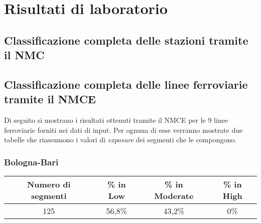 
\chapter{Risultati di laboratorio}
\label{risultati}
\section{Classificazione completa delle stazioni tramite il NMC}
\label{risultaticompleti}
\section{Classificazione completa delle linee ferroviarie tramite il NMCE}
Di seguito si mostrano i risultati ottenuti tramite il NMCE per le 9 linee ferroviarie forniti nei dati di input. Per ognuna di esse verranno mostrate due tabelle che riassumono i valori di \textit{exposure} dei segmenti  che le compongono.\\

\subsection{Bologna-Bari}
\centering
	\begin{tabular}  {|c|c|c|c|} 
	
		\hline 
		Numero di segmenti & \% in Low & \% in Moderate & \% in High \\ 
		\hline 
		125 & 56,8\% & 43,2\% & 0\% \\ 
		\hline 
	\end{tabular} 

